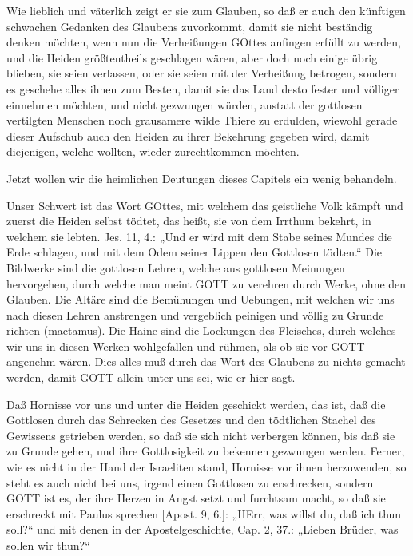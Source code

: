Wie lieblich und väterlich zeigt er sie zum Glauben, so daß er auch den künftigen schwachen Gedanken des Glaubens zuvorkommt, damit sie nicht beständig denken möchten, wenn nun die Verheißungen GOttes anfingen erfüllt zu werden, und die Heiden größtentheils geschlagen wären, aber doch noch einige übrig blieben, sie seien verlassen, oder sie seien mit der Verheißung betrogen, sondern es geschehe alles ihnen zum Besten, damit sie das Land desto fester und völliger einnehmen möchten, und nicht gezwungen würden, anstatt der gottlosen vertilgten Menschen noch grausamere wilde Thiere zu erdulden, wiewohl gerade dieser Aufschub auch den Heiden zu ihrer Bekehrung gegeben wird, damit diejenigen, welche wollten, wieder zurechtkommen möchten.

Jetzt wollen wir die heimlichen Deutungen dieses Capitels ein wenig behandeln.

Unser Schwert ist das Wort GOttes, mit welchem das geistliche Volk kämpft und zuerst die Heiden selbst tödtet, das heißt, sie von dem Irrthum bekehrt, in welchem sie lebten. Jes. 11, 4.: „Und er wird mit dem Stabe seines Mundes die Erde schlagen, und mit dem Odem seiner Lippen den Gottlosen tödten.“ Die Bildwerke sind die gottlosen Lehren, welche aus gottlosen Meinungen hervorgehen, durch welche man meint GOTT zu verehren durch Werke, ohne den Glauben. Die Altäre sind die Bemühungen und Uebungen, mit welchen wir uns nach diesen Lehren anstrengen und vergeblich peinigen und völlig zu Grunde richten (mactamus). Die Haine sind die Lockungen des Fleisches, durch welches wir uns in diesen Werken wohlgefallen und rühmen, als ob sie vor GOTT angenehm wären. Dies alles muß durch das Wort des Glaubens zu nichts gemacht werden, damit GOTT allein unter uns sei, wie er hier sagt.

Daß Hornisse vor uns und unter die Heiden geschickt werden, das ist, daß die Gottlosen durch das Schrecken des Gesetzes und den tödtlichen Stachel des Gewissens getrieben werden, so daß sie sich nicht verbergen können, bis daß sie zu Grunde gehen, und ihre Gottlosigkeit zu bekennen gezwungen werden. Ferner, wie es nicht in der Hand der Israeliten stand, Hornisse vor ihnen herzuwenden, so steht es auch nicht bei uns, irgend einen Gottlosen zu erschrecken, sondern GOTT ist es, der ihre Herzen in Angst setzt und furchtsam macht, so daß sie erschreckt mit Paulus sprechen [Apost. 9, 6.]: „HErr, was willst du, daß ich thun soll?“ und mit denen in der Apostelgeschichte, Cap. 2, 37.: „Lieben Brüder, was sollen wir thun?“

